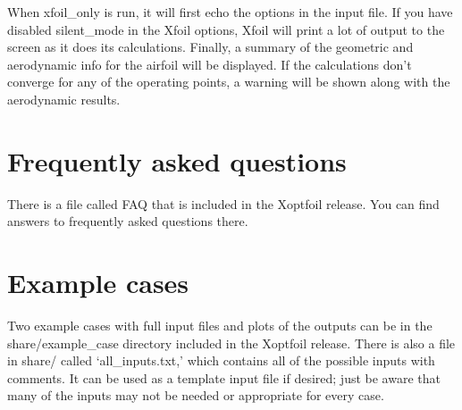 \documentclass[11pt]{article}
\begin{document}
When xfoil\_only is run, it will first echo the options in the input file. If you have
disabled silent\_mode in the Xfoil options, Xfoil will print a lot of output to the screen
as it does its calculations. Finally, a summary of the geometric and aerodynamic info for
the airfoil will be displayed. If the calculations don't converge for any of the operating
points, a warning will be shown along with the aerodynamic results.

\section{Frequently asked questions}

There is a file called FAQ that is included in the Xoptfoil release. You can find answers
to frequently asked questions there.

\section{Example cases}

Two example cases with full input files and plots of the outputs can be in the
share/example\_case directory included in the Xoptfoil release. There is also a file in
share/ called `all\_inputs.txt,' which contains all of the possible inputs with comments.
It can be used as a template input file if desired; just be aware that many of the inputs
may not be needed or appropriate for every case.
\end{document}

